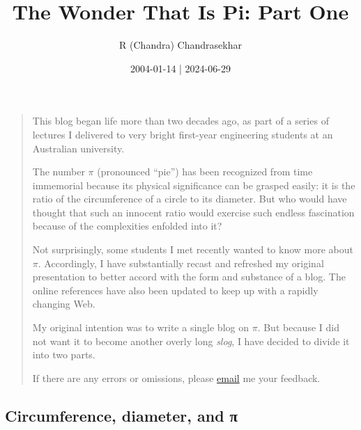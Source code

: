 \documentclass[
  a4paper,
]{article}
\title{The Wonder That Is Pi: Part One}
\author{R (Chandra) Chandrasekhar}
\date{2004-01-14 | 2024-06-29}
\begin{document}
\maketitle

\thispagestyle{empty}


\begin{quote}
This blog began life more than two decades ago, as part of a series of
lectures I delivered to very bright first-year engineering students at
an Australian university.

The number \(\pi\) (pronounced ``pie'') has been recognized from time
immemorial because its physical significance can be grasped easily: it
is the ratio of the circumference of a circle to its diameter. But who
would have thought that such an innocent ratio would exercise such
endless fascination because of the complexities enfolded into it?

Not surprisingly, some students I met recently wanted to know more about
\(\pi\). Accordingly, I have substantially recast and refreshed my
original presentation to better accord with the form and substance of a
blog. The online references have also been updated to keep up with a
rapidly changing Web.

My original intention was to write a single blog on \(\pi\). But because
I did not want it to become another overly long \emph{slog}, I have
decided to divide it into two parts.

If there are any errors or omissions, please
\href{mailto:feedback.swanlotus@gmail.com}{email} me your feedback.
\end{quote}

\subsection{Circumference, diameter, and
π}\label{circumference-diameter-and-ux3c0}
\end{document}
